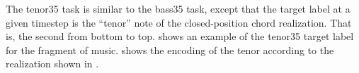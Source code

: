 
The \gls{tenor35} task is similar to the \gls{bass35} task,
except that the target label at a given timestep is the
``tenor'' note of the \gls{closed-position} chord
realization. That is, the second from bottom to top.
 shows an example of the \gls{tenor35}
target label for the fragment of music. 
shows the encoding of the tenor according to the realization
shown in .


